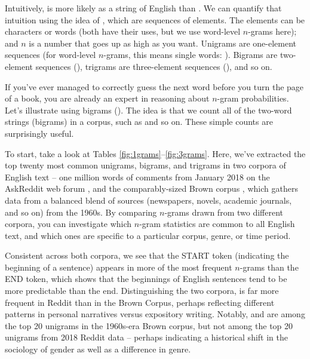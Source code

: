 
 Intuitively,  is more likely  as a string of English than . We can quantify that intuition using the idea of , which
  are sequences of elements.  The elements can be characters or words (both have their uses, but we use word-level $n$-grams here); and $n$ is a number that goes up as high as you want.  Unigrams are one-element sequences (for word-level $n$-grams, this means single words: ). Bigrams are two-element sequences (), trigrams are three-element sequences (), and so on.

If you've ever managed to correctly guess the next word before you turn the page of a book, you are already an expert in reasoning about $n$-gram probabilities.  Let's illustrate using bigrams ().  The idea is that we count all of the two-word strings (bigrams) in a corpus, such as  and so on.  These simple counts are surprisingly useful.

To start, take a look at Tables \ref{fig:1grams}--\ref{fig:3grams}.  Here, we've extracted the top twenty most common unigrams, bigrams, and trigrams in two corpora of English text -- one million words of comments from January 2018 on the AskReddit web forum  \citep{Baumgartner-etal:2020}, and the comparably-sized Brown corpus \citep{FrancisKucera:1979}, which gathers data from a balanced blend of sources (newspapers, novels, academic journals, and so on) from the 1960s.  By comparing $n$-grams drawn from two different corpora, you can investigate which $n$-gram statistics are common to all English text, and which ones are specific to a particular corpus, genre, or time period.  

Consistent across both corpora, we see that the START token (indicating the beginning of a sentence) appears in more of the most frequent $n$-grams than the END token, which shows that the beginnings of English sentences tend to be more predictable than the end.  Distinguishing the two corpora,  is far more frequent in Reddit than in the Brown Corpus, perhaps reflecting different patterns in  personal narratives versus expository writing.  Notably,  and  are among the top 20 unigrams in the 1960s-era Brown corpus, but not among the top 20 unigrams from 2018 Reddit data -- perhaps indicating a historical shift in the sociology of gender as well as a difference in genre.

